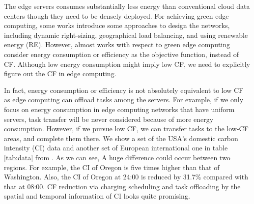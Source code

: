 \documentclass[conference, 10pt, ﬁnal, letterpaper, twocolumn]{IEEEtran}
\begin{document}
The edge servers consumes substantially less energy than conventional cloud data centers though they need to be densely deployed. For achieving green edge computing, some works introduce some approaches to design the networks\cite{mao2017survey}, including dynamic right-sizing, geographical load balancing, and using renewable energy (RE). However, almost works with respect to green edge computing consider energy consumption or efficiency as the objective function, instead of CF. Although low energy consumption might imply low CF, we need to explicitly figure out the CF in edge computing. 

In fact, energy consumption or efficiency is not absolutely equivalent to low CF as edge computing can offload tasks among the servers. For example, if we only focus on energy consumption in edge computing networks that have uniform servers, task transfer will be never considered because of more energy consumption. However, if we pursue low CF, we can transfer tasks to the low-CF areas, and complete them there. We show a set of the USA's domestic carbon intensity (CI) data and another set of European international one in table \ref{tab:data} from \cite{ElectricityMaps}. As we can see, A huge difference could occur between two regions. For example, the CI of Oregon is five times higher than that of Washington. Also, the CI of Oregon at 24:00 is reduced by 31.7\% compared with that at 08:00. CF reduction via charging scheduling and task offloading by the spatial and temporal information of CI looks quite promising.
\end{document}
